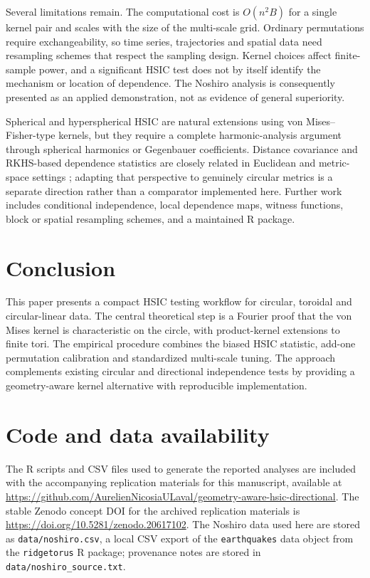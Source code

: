\documentclass[11pt]{article}
\begin{document}
Several limitations remain.  The computational cost is \(O(n^2B)\) for a single kernel pair and scales with the size of the multi-scale grid.  Ordinary permutations require exchangeability, so time series, trajectories and spatial data need resampling schemes that respect the sampling design.  Kernel choices affect finite-sample power, and a significant HSIC test does not by itself identify the mechanism or location of dependence.  The Noshiro analysis is consequently presented as an applied demonstration, not as evidence of general superiority.

Spherical and hyperspherical HSIC are natural extensions using von Mises--Fisher-type kernels, but they require a complete harmonic-analysis argument through spherical harmonics or Gegenbauer coefficients.  Distance covariance and RKHS-based dependence statistics are closely related in Euclidean and metric-space settings \citep{szekely2007distance,lyons2013metric,sejdinovic2013equivalence}; adapting that perspective to genuinely circular metrics is a separate direction rather than a comparator implemented here.  Further work includes conditional independence, local dependence maps, witness functions, block or spatial resampling schemes, and a maintained R package.

\section{Conclusion}

This paper presents a compact HSIC testing workflow for circular, toroidal and circular-linear data.  The central theoretical step is a Fourier proof that the von Mises kernel is characteristic on the circle, with product-kernel extensions to finite tori.  The empirical procedure combines the biased HSIC statistic, add-one permutation calibration and standardized multi-scale tuning.  The approach complements existing circular and directional independence tests by providing a geometry-aware kernel alternative with reproducible implementation.

\FloatBarrier

\section*{Code and data availability}

The R scripts and CSV files used to generate the reported analyses are included with the accompanying replication materials for this manuscript, available at \url{https://github.com/AurelienNicosiaULaval/geometry-aware-hsic-directional}.  The stable Zenodo concept DOI for the archived replication materials is \url{https://doi.org/10.5281/zenodo.20617102}.  The Noshiro data used here are stored as \texttt{data/noshiro.csv}, a local CSV export of the \texttt{earthquakes} data object from the \texttt{ridgetorus} R package; provenance notes are stored in \texttt{data/noshiro\_source.txt}.
\end{document}
